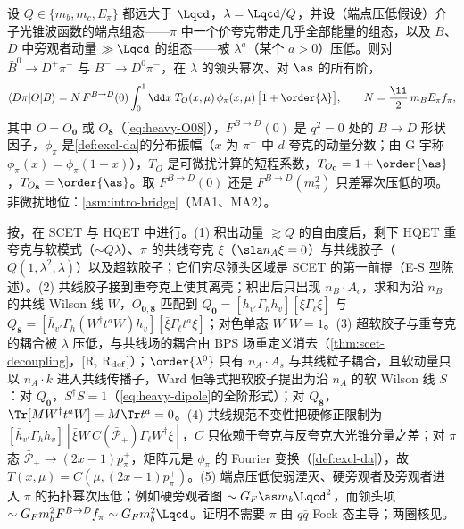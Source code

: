 \begin{theorem}\label{thm:heavy-bdpi}
设 $Q\in\{m_b,m_c,E_\pi\}$ 都远大于 $\Lqcd$，$\lambda=\Lqcd/Q$，并设（端点压低假设）介子光锥波函数的端点组态——$\pi$ 中一个价夸克带走几乎全部能量的组态，以及 $B$、$D$ 中旁观者动量 $\gg\Lqcd$ 的组态——被 $\lambda^{a}$（某个 $a>0$）压低。则对 $\bar B^0\to D^+\pi^-$ 与 $B^-\to D^0\pi^-$，在 $\lambda$ 的领头幂次、对 $\as$ 的所有阶，
\begin{equation}\label{eq:heavy-bdpi}
\langle D\pi|O|B\rangle=N\,F^{B\to D}(0)\int_0^1\dd x\;T_O(x,\mu)\,\phi_\pi(x,\mu)\,\big[1+\order{\lambda}\big],\qquad N=\frac{\ii}{2}\,m_BE_\pi f_\pi ,
\end{equation}
其中 $O=O_{\mathbf 0}$ 或 $O_{\mathbf 8}$（\cref{eq:heavy-O08}），$F^{B\to D}(0)$ 是 $q^2=0$ 处的 $B\to D$ 形状因子，$\phi_\pi$ 是\cref{def:excl-da}的分布振幅（$x$ 为 $\pi^-$ 中 $d$ 夸克的动量分数；由 G 宇称 $\phi_\pi(x)=\phi_\pi(1-x)$），$T_O$ 是可微扰计算的短程系数，$T_{O_{\mathbf 0}}=1+\order{\as}$，$T_{O_{\mathbf 8}}=\order{\as}$。取 $F^{B\to D}(0)$ 还是 $F^{B\to D}(m_\pi^2)$ 只差幂次压低的项。
非微扰地位：\cref{asm:intro-bridge}（MA1、MA2）。
\end{theorem}

\begin{proofsketch}
按\cite{BauerPirjolStewart2001}，在 SCET 与 HQET 中进行。(1) 积出动量 $\gtrsim Q$ 的自由度后，剩下 HQET 重夸克与软模式（$\sim Q\lambda$）、$\pi$ 的共线夸克 $\xi$（$\sla n_A\xi=0$）与共线胶子（$Q(1,\lambda^2,\lambda)$）以及超软胶子；它们穷尽领头区域是 SCET 的第一前提（E-S 型陈述）。(2) 共线胶子接到重夸克上使其离壳；积出后只出现 $n_B\cdot A_c$，求和为沿 $n_B$ 的共线 Wilson 线 $W$，$O_{\mathbf 0,\mathbf 8}$ 匹配到 $Q_{\mathbf 0}=[\bar h_{v'}\Gamma_hh_v][\bar\xi\Gamma_\ell\xi]$ 与 $Q_{\mathbf 8}=[\bar h_{v'}\Gamma_h(W^\dagger t^aW)h_v][\bar\xi\Gamma_\ell t^a\xi]$；对色单态 $W^\dagger W=1$。(3) 超软胶子与重夸克的耦合被 $\lambda$ 压低，与共线场的耦合由 BPS 场重定义消去（\cref{thm:scet-decoupling}，[R, R$_{\rm def}$]）；$\order{\lambda^0}$ 只有 $n_A\cdot A_s$ 与共线粒子耦合，且软动量只以 $n_A\cdot k$ 进入共线传播子，Ward 恒等式把软胶子提出为沿 $n_A$ 的软 Wilson 线 $S$：对 $Q_{\mathbf 0}$，$S^\dagger S=1$（\cref{eq:heavy-dipole}的全阶形式）；对 $Q_{\mathbf 8}$，$\Tr[MW^\dagger t^aW]=M\Tr t^a=0$\cite[式~(7)]{BauerPirjolStewart2001}。(4) 共线规范不变性把硬修正限制为 $[\bar h_{v'}\Gamma_hh_v][\bar\xi W\,C(\bar{\mathcal P}_+)\Gamma_\ell W^\dagger\xi]$，$C$ 只依赖于夸克与反夸克大光锥分量之差；对 $\pi$ 态 $\bar{\mathcal P}_+\to(2x-1)p_\pi^+$，矩阵元是 $\phi_\pi$ 的 Fourier 变换（\cref{def:excl-da}），故 $T(x,\mu)=C(\mu,(2x-1)p_\pi^+)$。(5) 端点压低使弱湮灭、硬旁观者及旁观者进入 $\pi$ 的拓扑幂次压低；例如硬旁观者图 $\sim G_F\as m_b\Lqcd^2$，而领头项 $\sim G_Fm_b^2F^{B\to D}f_\pi\sim G_Fm_b^2\Lqcd$\cite{BenekeEtAl2000}。证明不需要 $\pi$ 由 $q\bar q$ Fock 态主导；两圈核见\cite{Huber:2016xod}。
\end{proofsketch}

